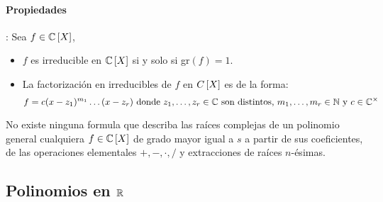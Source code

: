 \paragraph{Propiedades}: Sea $f\in\mathbb{C}\left[X\right]$,
\begin{itemize}
    \item $f$ es irreducible en $\mathbb{C}\left[X\right]$ si y solo si gr$(f)=1$.
    \item La factorización en irreducibles de $f$ en $C\left[X\right]$ es de la forma:
    \begin{equation*}
        f = c(x-z_1)^{m_1}\dots(x-z_r) \text{ donde } z_1,\dots,z_r\in\mathbb{C}  \text{ son distintos, } m_1,\dots,m_r\in\mathbb{N} \text{ y } c\in\mathbb{C}^\times
    \end{equation*}
\end{itemize}
No existe ninguna formula que describa las raíces complejas de un polinomio general cualquiera $f\in\mathbb{C}\left[X\right]$ de grado mayor igual a $s$ a partir de sus coeficientes, de las operaciones elementales $+,-,\cdot,/$ y extracciones de raíces $n$-ésimas.

\subsection{Polinomios en \texorpdfstring{$\mathbb{R}$}{reales}}
